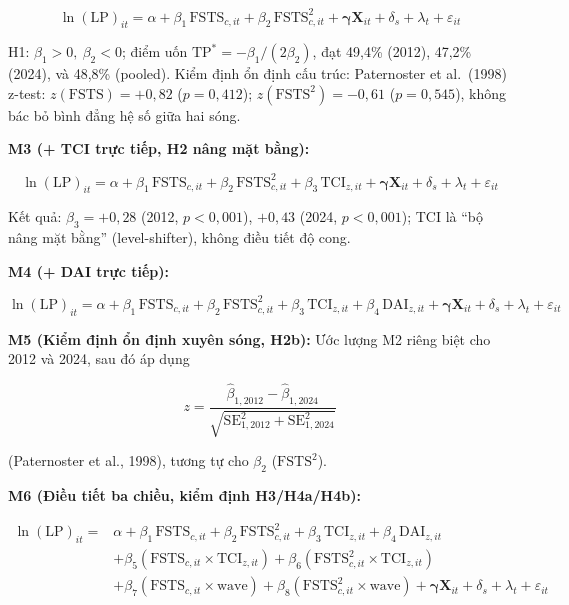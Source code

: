 \documentclass[
  a4paper,
  13pt]{extreport}
\begin{document}
\[\ln(\mathrm{LP})_{it} = \alpha + \beta_1\,\mathrm{FSTS}_{c,it} + \beta_2\,\mathrm{FSTS}_{c,it}^{2} + \boldsymbol{\gamma}\mathbf{X}_{it} + \delta_s + \lambda_t + \varepsilon_{it}\]

H1: \(\beta_1 > 0,\ \beta_2 < 0\); điểm uốn
\(\mathrm{TP}^{*} = -\beta_1/(2\beta_2)\), đạt 49,4\% (2012), 47,2\%
(2024), và 48,8\% (pooled). Kiểm định ổn định cấu trúc: Paternoster et
al.~(1998) z-test: \(z(\mathrm{FSTS}) = +0{,}82\) (\(p = 0{,}412\));
\(z(\mathrm{FSTS}^{2}) = -0{,}61\) (\(p = 0{,}545\)), không bác bỏ bình
đẳng hệ số giữa hai sóng.

\textbf{M3 (+ TCI trực tiếp, H2 nâng mặt bằng):}

\[\ln(\mathrm{LP})_{it} = \alpha + \beta_1\,\mathrm{FSTS}_{c,it} + \beta_2\,\mathrm{FSTS}_{c,it}^{2} + \beta_3\,\mathrm{TCI}_{z,it} + \boldsymbol{\gamma}\mathbf{X}_{it} + \delta_s + \lambda_t + \varepsilon_{it}\]

Kết quả: \(\beta_3 = +0{,}28\) (2012, \(p < 0{,}001\)), \(+0{,}43\)
(2024, \(p < 0{,}001\)); TCI là ``bộ nâng mặt bằng'' (level-shifter),
không điều tiết độ cong.

\textbf{M4 (+ DAI trực tiếp):}

\[\ln(\mathrm{LP})_{it} = \alpha + \beta_1\,\mathrm{FSTS}_{c,it} + \beta_2\,\mathrm{FSTS}_{c,it}^{2} + \beta_3\,\mathrm{TCI}_{z,it} + \beta_4\,\mathrm{DAI}_{z,it} + \boldsymbol{\gamma}\mathbf{X}_{it} + \delta_s + \lambda_t + \varepsilon_{it}\]

\textbf{M5 (Kiểm định ổn định xuyên sóng, H2b):} Ước lượng M2 riêng biệt
cho 2012 và 2024, sau đó áp dụng

\[z = \frac{\hat\beta_{1,2012} - \hat\beta_{1,2024}}{\sqrt{\mathrm{SE}_{1,2012}^{2} + \mathrm{SE}_{1,2024}^{2}}}\]

(Paternoster et al., 1998), tương tự cho \(\beta_2\)
(\(\mathrm{FSTS}^{2}\)).

\textbf{M6 (Điều tiết ba chiều, kiểm định H3/H4a/H4b):}

\[\begin{aligned}
\ln(\mathrm{LP})_{it} = {} & \alpha + \beta_1\,\mathrm{FSTS}_{c,it} + \beta_2\,\mathrm{FSTS}_{c,it}^{2} + \beta_3\,\mathrm{TCI}_{z,it} + \beta_4\,\mathrm{DAI}_{z,it} \\
& + \beta_5(\mathrm{FSTS}_{c,it} \times \mathrm{TCI}_{z,it}) + \beta_6(\mathrm{FSTS}_{c,it}^{2} \times \mathrm{TCI}_{z,it}) \\
& + \beta_7(\mathrm{FSTS}_{c,it} \times \mathrm{wave}) + \beta_8(\mathrm{FSTS}_{c,it}^{2} \times \mathrm{wave}) + \boldsymbol{\gamma}\mathbf{X}_{it} + \delta_s + \lambda_t + \varepsilon_{it}
\end{aligned}\]
\end{document}
